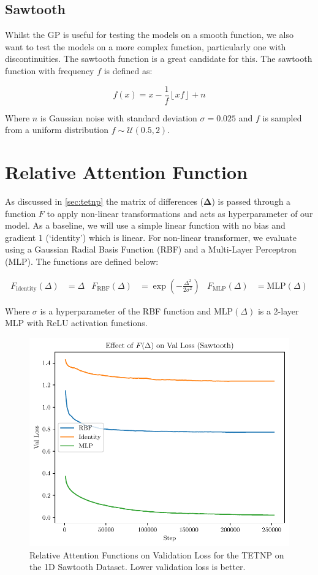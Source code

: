 \documentclass[../../main.tex]{subfiles}
\begin{document}
\subsection{Sawtooth}
\label{sec:1d-sawtooth-dataset}

Whilst the GP is useful for testing the models on a smooth function, we also want to test the models on a more complex function, particularly one with discontinuities. The sawtooth function is a great candidate for this. The sawtooth function with frequency $f$ is defined as:

\begin{equation}
	f(x) = x - \frac{1}{f} \left\lfloor xf \right\rfloor + n
\end{equation}

Where $n$ is Gaussian noise with standard deviation $\sigma = 0.025$ and $f$ is sampled from a uniform distribution $f \sim \mathcal{U}(0.5, 2)$.


\section{Relative Attention Function}

As discussed in \autoref{sec:tetnp} the matrix of differences ($\bm{\Delta}$) is passed through a function $F$ to apply non-linear transformations and acts as hyperparameter of our model. As a baseline, we will use a simple linear function with no bias and gradient 1 (`identity') which is linear. For non-linear transformer, we evaluate using a Gaussian Radial Basis Function (RBF) and a Multi-Layer Perceptron (MLP). The functions are defined below:

\begin{align}
	F_{\text{identity}}(\Delta) &= \Delta&
	F_{\text{RBF}}(\Delta) &= \exp\left(-\frac{\Delta^2}{2\sigma^2}\right)&
	F_{\text{MLP}}(\Delta) &= \text{MLP}(\Delta)
\end{align}

Where $\sigma$ is a hyperparameter of the RBF function and $\text{MLP}(\Delta)$ is a 2-layer MLP with ReLU \cite{agarap2019deep} activation functions.

\begin{figure}[H]
	\centering
	\includegraphics[width=0.6\linewidth]{./F-on-loss.pdf}
	\caption{Relative Attention Functions on Validation Loss for the TETNP on the 1D Sawtooth Dataset. Lower validation loss is better.}
	\label{fig:relative-attn-func-1d}
\end{figure}
\end{document}

